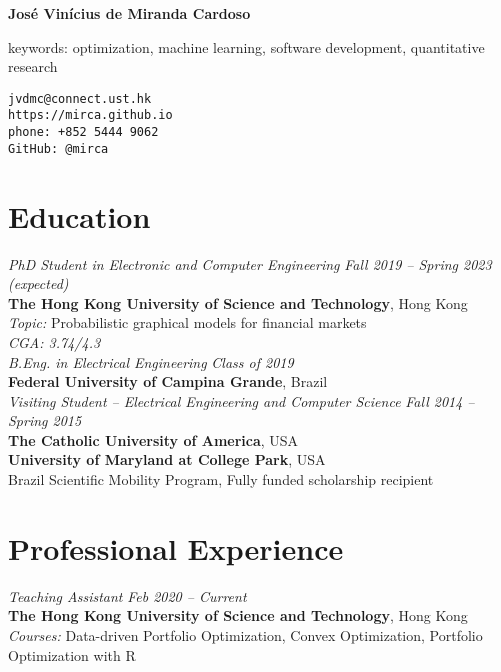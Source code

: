 \documentclass[10pt]{article}
\begin{document}
\pagestyle{empty}
\begin{titlepage}
     {\Large{\textbf{Jos\'e Vin\'icius de Miranda Cardoso}}}
     \vspace{.5cm}

    \begin{minipage}[b]{9cm}
      keywords: optimization, machine learning, software development, quantitative research
    \end{minipage}
    \hfill
    \begin{minipage}[b]{5cm}
        \texttt{jvdmc@connect.ust.hk}\\
        \texttt{https://mirca.github.io}\\
        \texttt{phone: +852 5444 9062}\\
        \texttt{GitHub: @mirca}
    \end{minipage}


\section*{Education}

\emph{PhD Student in Electronic and Computer Engineering} \hfill \textit{Fall 2019 -- Spring 2023 (expected)} \\
\textbf{The Hong Kong University of Science and Technology}, Hong Kong\\
\textit{Topic:} Probabilistic graphical models for financial markets\\
\textit{CGA: 3.74/4.3}\\

\emph{B.Eng. in Electrical Engineering} \hfill \textit{Class of 2019} \\
\textbf{Federal University of Campina Grande}, Brazil \\

\emph{Visiting Student -- Electrical Engineering and Computer Science} \hfill \textit{Fall 2014 -- Spring 2015} \\
\textbf{The Catholic University of America}, USA\\
\textbf{University of Maryland at College Park}, USA \\
Brazil Scientific Mobility Program, Fully funded scholarship recipient

\section*{Professional Experience}


\emph{Teaching Assistant} \hfill \textit{Feb 2020 -- Current}
\\ \textbf{The Hong Kong University of Science and Technology}, Hong Kong
  \\ {\small\textit{Courses:} Data-driven Portfolio Optimization, Convex Optimization, Portfolio Optimization with \textsf{R}}
\vspace{.5cm}


\end{titlepage}
\end{document}
